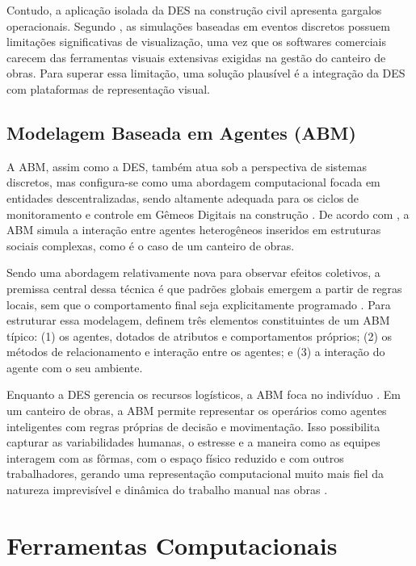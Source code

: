 Contudo, a aplicação isolada da DES na construção civil apresenta gargalos operacionais. Segundo , as simulações baseadas em eventos discretos possuem limitações significativas de visualização, uma vez que os softwares comerciais carecem das ferramentas visuais extensivas exigidas na gestão do canteiro de obras. Para superar essa limitação, uma solução plausível é a integração da DES com plataformas de representação visual. 

\subsection{Modelagem Baseada em Agentes (ABM)}
\label{sec:ABM}

A ABM, assim como a DES, também atua sob a perspectiva de sistemas discretos, mas configura-se como uma abordagem computacional focada em entidades descentralizadas, sendo altamente adequada para os ciclos de monitoramento e controle em Gêmeos Digitais na construção \cite{sacks2020}. De acordo com , a ABM simula a interação entre agentes heterogêneos inseridos em estruturas sociais complexas, como é o caso de um canteiro de obras.

Sendo uma abordagem relativamente nova para observar efeitos coletivos, a premissa central dessa técnica é que padrões globais emergem a partir de regras locais, sem que o comportamento final seja explicitamente programado \cite{mustafee2015}. Para estruturar essa modelagem, \cite{macal2005} definem três elementos constituintes de um ABM típico: (1) os agentes, dotados de atributos e comportamentos próprios; (2) os métodos de relacionamento e interação entre os agentes; e (3) a interação do agente com o seu ambiente.

Enquanto a DES gerencia os recursos logísticos, a ABM foca no indivíduo \cite{mustafee2015}. Em um canteiro de obras, a ABM permite representar os operários como agentes inteligentes com regras próprias de decisão e movimentação. Isso possibilita capturar as variabilidades humanas, o estresse e a maneira como as equipes interagem com as fôrmas, com o espaço físico reduzido e com outros trabalhadores, gerando uma representação computacional muito mais fiel da natureza imprevisível e dinâmica do trabalho manual nas obras \cite{mustafee2015}.

\section{Ferramentas Computacionais}
\label{sec:ferramentas}

